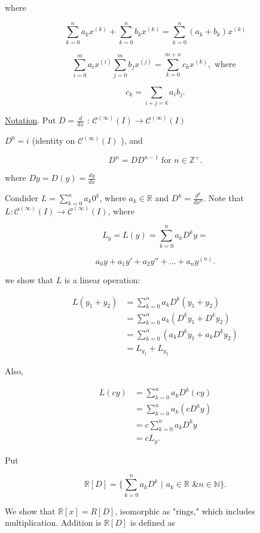 where

\[ \sum_{k=0}^n a_kx^{(k)} + \sum_{k=0}^n b_kx^{(k)} = \sum_{k=0}^n
(a_k + b_k)x^{(k)}   \]

\[ \sum_{i=0}^m a_ix^{(i)} \sum_{j=0}^m b_jx^{(j)}  = \sum_{k=0}^{m+n}
c_k x^{(k)}, \text{ where }\]

\[ c_k = \sum_{i+j=k} a_ib_j .\]

\underline{Notation}. Put \( D = \frac{d}{dx} \text{ : }
\mathscr{C}^{(\infty)} (I) \to \mathscr{C}^{(\infty)} (I) \) 

\( D^0 = i \) (identity on \(\mathscr{C}^{(\infty)} (I) \) ), and 

\[ D^n = D D^{n-1} \text{ for } n \in \mathbb{Z}^+ .\]

\hrulefill

where \( Dy = D(y) = \frac{dy}{dx} \)

Condider \( L = \sum_{k=0}^n a_k 0^k \), where \( a_k \in \mathbb{R} \)
and \( D^k = \frac{d^k}{dx^k} \). Note that \( L :
\mathscr{C}^{(\infty)} (I) \to \mathscr{C}^{(\infty)} (I)   \), where  

\[ L_y = L(y) = \sum_{k=0}^n a_k D^k y = \]

\[ a_0y + a_1y' + a_2y'' + \dots + a_ny^{(n)}. \]

we show that \( L \) is a linear operation: 


\begin{align*}
  L(y_1 + y_2) &= \sum_{k=0}^n a_k D^k (y_1 + y_2) \\
  &= \sum_{k=0}^n a_k (D^ky_1 + D^ky_2) \\
  &= \sum_{k=0}^n (a_kD^ky_1 + a_kD^ky_2) \\
  &= L_{y_1} + L_{y_2}
\end{align*}

Also, 

\begin{align*}
  L(cy) &= \sum_{k=0}^n a_k D^k(cy) \\
  &= \sum_{k=0}^n a_k (cD^ky) \\
  &= c\sum_{k=0}^n a_k D^ky \\
  &= cL_y.
\end{align*}

Put 

\[ \mathbb{R} [D] = \{ \sum_{k=0}^n a_k D^k \text{ | } a_k \in
\mathbb{R} \text{ \& } n \in \mathbb{N} \}. \]

We show that \( \mathbb{R}[x] = R[D] \), isomorphic as "rings," which
includes multiplication. Addition is \( \mathbb{R}[D] \) is defined as

